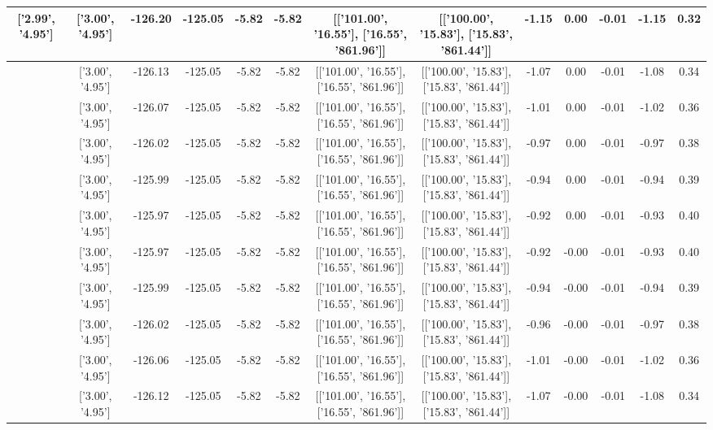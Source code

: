 \begin{table}[htbp]
\begin{adjustbox}{angle=90}
\begin{tabular}{|c|c|c|c|c|c|c|c|c|c|c|c|c|}
 ['2.99', '4.95'] & ['3.00', '4.95'] & -126.20 & -125.05 & -5.82 & -5.82 & [['101.00', '16.55'], ['16.55', '861.96']] & [['100.00', '15.83'], ['15.83', '861.44']] & -1.15 & 0.00 & -0.01 & -1.15 & 0.32\\ \hline
 ['2.99', '4.95'] & ['3.00', '4.95'] & -126.13 & -125.05 & -5.82 & -5.82 & [['101.00', '16.55'], ['16.55', '861.96']] & [['100.00', '15.83'], ['15.83', '861.44']] & -1.07 & 0.00 & -0.01 & -1.08 & 0.34\\ \hline
 ['3.00', '4.95'] & ['3.00', '4.95'] & -126.07 & -125.05 & -5.82 & -5.82 & [['101.00', '16.55'], ['16.55', '861.96']] & [['100.00', '15.83'], ['15.83', '861.44']] & -1.01 & 0.00 & -0.01 & -1.02 & 0.36\\ \hline
 ['3.00', '4.95'] & ['3.00', '4.95'] & -126.02 & -125.05 & -5.82 & -5.82 & [['101.00', '16.55'], ['16.55', '861.96']] & [['100.00', '15.83'], ['15.83', '861.44']] & -0.97 & 0.00 & -0.01 & -0.97 & 0.38\\ \hline
 ['3.00', '4.95'] & ['3.00', '4.95'] & -125.99 & -125.05 & -5.82 & -5.82 & [['101.00', '16.55'], ['16.55', '861.96']] & [['100.00', '15.83'], ['15.83', '861.44']] & -0.94 & 0.00 & -0.01 & -0.94 & 0.39\\ \hline
 ['3.00', '4.95'] & ['3.00', '4.95'] & -125.97 & -125.05 & -5.82 & -5.82 & [['101.00', '16.55'], ['16.55', '861.96']] & [['100.00', '15.83'], ['15.83', '861.44']] & -0.92 & 0.00 & -0.01 & -0.93 & 0.40\\ \hline
 ['3.00', '4.95'] & ['3.00', '4.95'] & -125.97 & -125.05 & -5.82 & -5.82 & [['101.00', '16.55'], ['16.55', '861.96']] & [['100.00', '15.83'], ['15.83', '861.44']] & -0.92 & -0.00 & -0.01 & -0.93 & 0.40\\ \hline
 ['3.00', '4.95'] & ['3.00', '4.95'] & -125.99 & -125.05 & -5.82 & -5.82 & [['101.00', '16.55'], ['16.55', '861.96']] & [['100.00', '15.83'], ['15.83', '861.44']] & -0.94 & -0.00 & -0.01 & -0.94 & 0.39\\ \hline
 ['3.00', '4.95'] & ['3.00', '4.95'] & -126.02 & -125.05 & -5.82 & -5.82 & [['101.00', '16.55'], ['16.55', '861.96']] & [['100.00', '15.83'], ['15.83', '861.44']] & -0.96 & -0.00 & -0.01 & -0.97 & 0.38\\ \hline
 ['3.00', '4.95'] & ['3.00', '4.95'] & -126.06 & -125.05 & -5.82 & -5.82 & [['101.00', '16.55'], ['16.55', '861.96']] & [['100.00', '15.83'], ['15.83', '861.44']] & -1.01 & -0.00 & -0.01 & -1.02 & 0.36\\ \hline
 ['3.01', '4.95'] & ['3.00', '4.95'] & -126.12 & -125.05 & -5.82 & -5.82 & [['101.00', '16.55'], ['16.55', '861.96']] & [['100.00', '15.83'], ['15.83', '861.44']] & -1.07 & -0.00 & -0.01 & -1.08 & 0.34\\ \hline

\end{tabular}
\end{adjustbox}
\end{table}
